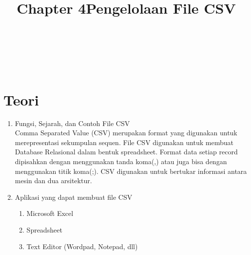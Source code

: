 \clearpage
\setcounter{page}{1}

\begin{center}
\title{\LARGE \bf Chapter 4}\\
\title{\LARGE \bf Pengelolaan File CSV}\\
\end{center}

\appendix
\section{Teori}

\begin{enumerate}
\item Fungsi, Sejarah, dan Contoh File CSV\\
Comma Separated Value (CSV) merupakan format yang digunakan untuk merepresentasi sekumpulan sequen. File CSV digunakan untuk membuat Database Relasional dalam bentuk spreadsheet. Format data setiap record dipisahkan dengan menggunakan tanda koma(,) atau juga bisa dengan menggunakan titik koma(;). CSV digunakan untuk bertukar informasi antara mesin dan dua arsitektur.\\

\item Aplikasi yang dapat membuat file CSV
\begin {enumerate}
\item Microsoft Excel
\item Spreadsheet
\item Text Editor (Wordpad, Notepad, dll)
\end{enumerate}


\end{enumerate}
